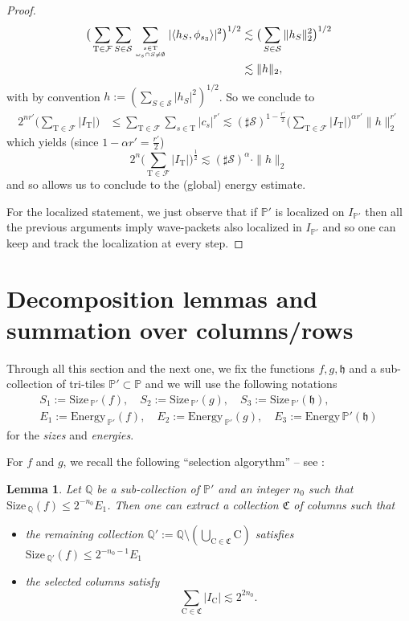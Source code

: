 \documentclass[a4paper,11pt,oneside]{amsart}
\newcommand{\hh}{\mathfrak{h}}
\newcommand{\PP}{\mathbb{P}}
\newcommand{\QQ}{\mathbb{Q}}
\newcommand{\FF}{\mathcal{F}}
\newcommand{\CC}{\mathrm{C}}
\newcommand{\TT}{\mathrm{T}}
\newcommand{\size}{\mathrm{Size\, }}
\newcommand{\energy}{\mathrm{Energy \,}}
\theoremstyle{plain}
\newtheorem{lemma}[theorem]{Lemma}
\theoremstyle{definition}
\begin{document}
\begin{proof}
\begin{align*}
\big(\sum_{\TT\in \FF} \sum_{S\in {\mathcal S}} \sum_{s\in \TT \atop \omega_s \cap S \neq\emptyset} |\langle h_S,\phi_{s_3}\rangle|^{2}\big)^{1/2} & \lesssim \big(\sum_{S\in {\mathcal S}} \|h_S \|_2^2\big)^{1/2} \\
& \lesssim \|h\|_{2},
\end{align*}
with by convention $h:=(\sum_{S\in {\mathcal S}} |h_S|^2)^{1/2}$. So we conclude to
\begin{align*}
2^{nr'} \big(\sum_{\TT\in \FF} |I_{\TT}| \big) & \leq
\sum_{\TT\in \FF} \sum_{s\in \TT} |c_s|^{r'}  \lesssim (\sharp {\mathcal S})^{1-\frac{r'}{2}}
\big(\sum_{\TT\in \FF} |I_{\TT}|\big)^{\alpha r'} \|h\|_2^{r'} 
\end{align*}
which yields (since $1-\alpha r'=\frac{r'}{2}$)
$$ 2^{n} \big(\sum_{\TT\in \FF} |I_{\TT}| \big)^{\frac{1}{2}} \lesssim (\sharp {\mathcal S})^{\alpha} \cdot \|h\|_2$$
and so allows us to conclude to the (global) energy estimate.

For the localized statement, we just observe that if $\PP'$ is localized on $I_{\PP'}$ then all the previous arguments imply wave-packets also localized in $I_{\PP'}$ and so one can keep and track the localization at every step.
\end{proof}


\section{Decomposition lemmas and summation over columns/rows}

Through all this section and the next one, we fix the functions $f,g,\hh$ and a sub-collection of tri-tiles $\PP'\subset \PP$ and we will use the following notations
\begin{gather*}
S_1:=\size_{\PP'}(f),\quad S_2:=\size_{\PP'}(g),\quad S_3:=\size_{\PP'}(\hh),\\
 E_1:=\energy_{\PP'}(f), \quad E_2:=\energy_{\PP'}(g), \quad E_3:=\energy{\PP'}(\hh)
\end{gather*}
for the {\it sizes} and {\it energies}.

For $f$ and $g$, we recall the following ``selection algorythm'' -- see \cite[Lemma 3.9]{BB}:

\begin{lemma} \label{lemma:selection:f} Let $\QQ$ be a sub-collection of $\PP'$ and an integer $n_0$ such that $\size_{\QQ}(f)\leq 2^{-n_0} E_1$. Then one can extract a collection $\mathfrak{C}$ of columns such that 
\begin{itemize}
\item the remaining collection $\QQ':=\QQ\setminus (\bigcup_{\CC\in{\mathfrak{C}}} \CC)$ satisfies $\size_{\QQ'}(f)\leq 2^{-n_0-1} E_1$
\item the selected columns satisfy 
$$\sum_{\CC\in{\mathfrak{C}}} |I_{\CC}| \lesssim 2^{2n_0}.$$
\end{itemize}
\end{lemma}
\end{document}
